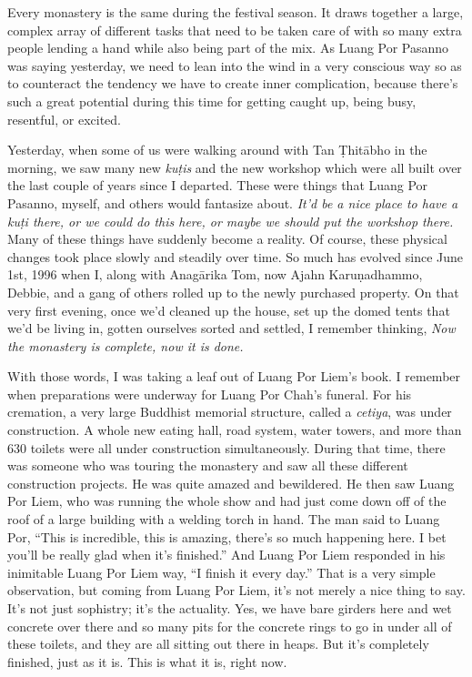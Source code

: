 Every monastery is the same during the festival season. It draws 
together a large, complex array of different tasks that need to be 
taken care of with so many extra people lending a hand while also being 
part of the mix. As Luang Por Pasanno was saying yesterday, we need to 
lean into the wind in a very conscious way so as to counteract the 
tendency we have to create inner complication, because there's such a 
great potential during this time for getting caught up, being busy, 
resentful, or excited.

Yesterday, when some of us were walking around with Tan Ṭhitābho in 
the morning, we saw many new \emph{kuṭis} and the new workshop which 
were all built over the last couple of years since I departed. These 
were things that Luang Por Pasanno, myself, and others would fantasize 
about. \emph{It'd be a nice place to have a kuṭi there, or we could 
do this here, or maybe we should put the workshop there.} Many of these 
things have suddenly become a reality. Of course, these physical 
changes took place slowly and steadily over time. So much has evolved 
since June 1st, 1996 when I, along with Anagārika Tom, now Ajahn 
Karuṇadhammo, Debbie, and a gang of others rolled up to the newly 
purchased property. On that very first evening, once we'd cleaned up 
the house, set up the domed tents that we'd be living in, gotten 
ourselves sorted and settled, I remember thinking, \emph{Now the 
monastery is complete, now it is done.}

With those words, I was taking a leaf out of Luang Por Liem's book. I 
remember when preparations were underway for Luang Por Chah's funeral. 
For his cremation, a very large Buddhist memorial structure, called a 
\emph{cetiya}, was under construction. A whole new eating hall, road 
system, water towers, and more than 630 toilets were all under 
construction simultaneously. During that time, there was someone who 
was touring the monastery and saw all these different construction 
projects. He was quite amazed and bewildered. He then saw Luang Por 
Liem, who was running the whole show and had just come down off of the 
roof of a large building with a welding torch in hand. The man said to 
Luang Por, ``This is incredible, this is amazing, there's so much 
happening here. I bet you'll be really glad when it's finished.'' And 
Luang Por Liem responded in his inimitable Luang Por Liem way, ``I 
finish it every day.'' That is a very simple observation, but coming 
from Luang Por Liem, it's not merely a nice thing to say. It's not just 
sophistry; it's the actuality. Yes, we have bare girders here and wet 
concrete over there and so many pits for the concrete rings to go in 
under all of these toilets, and they are all sitting out there in 
heaps. But it's completely finished, just as it is. This is what it is, 
right now.

